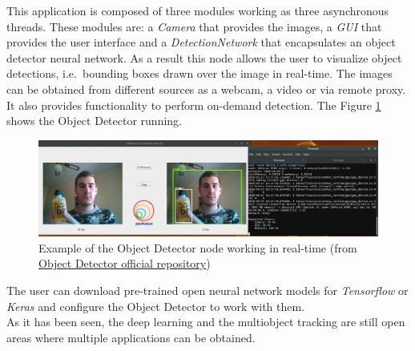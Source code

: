 This application is composed of three modules working as three  asynchronous threads. These modules are: a \textit{Camera} that provides the images, a \textit{GUI} that provides the user interface and a \textit{DetectionNetwork} that encapsulates an object detector neural network. As a result this node allows the user to visualize object detections, i.e.\ bounding boxes drawn over the image in real-time. The images can be obtained from different sources as a webcam, a video or via remote proxy. It also provides functionality to perform on-demand detection. The Figure \ref{fig:object_detector} shows the Object Detector running.
\begin{figure}[H]
\begin{center}
\includegraphics[scale=0.25]{figures/object_detector.png}
\caption{Example of the Object Detector node working in real-time (from \href{https://github.com/JdeRobot/dl-objectdetector}{Object Detector official repository})}
\label{fig:object_detector}
\end{center}
\end{figure}
The user can download pre-trained open neural network models for \textit{Tensorflow} or \textit{Keras} and configure the Object Detector to work with them.\\
As it has been seen, the deep learning and the multiobject tracking are still open areas where multiple applications can be obtained.\\

